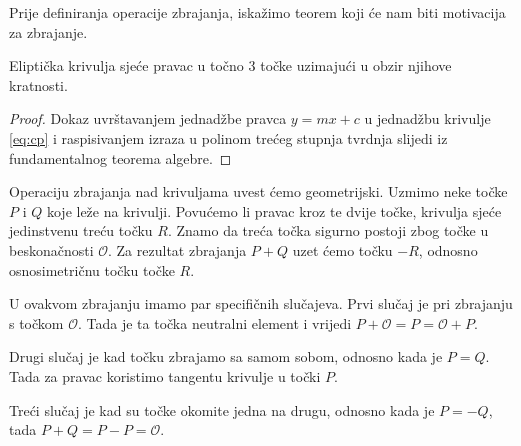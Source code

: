 \documentclass{mathos}
\begin{document}
Prije definiranja operacije zbrajanja, iskažimo teorem koji će nam biti motivacija za zbrajanje.

\begin{theorem}
    Eliptička krivulja sjeće pravac u točno 3 točke uzimajući u obzir njihove kratnosti.
\end{theorem}
\begin{proof}
    Dokaz uvrštavanjem jednadžbe pravca $y = mx + c$ u jednadžbu krivulje \ref{eq:cp} i raspisivanjem izraza u polinom trećeg stupnja tvrdnja slijedi iz fundamentalnog teorema algebre.
\end{proof}

Operaciju zbrajanja nad krivuljama uvest ćemo geometrijski. Uzmimo neke točke $P$ i $Q$ koje leže na krivulji. Povućemo li pravac kroz te dvije točke, krivulja sjeće jedinstvenu treću točku $R$. Znamo da treća točka sigurno postoji zbog točke u beskonačnosti $\mathcal{O}$. Za rezultat zbrajanja $P + Q$ uzet ćemo točku $-R$, odnosno osnosimetričnu točku točke $R$. 

U ovakvom zbrajanju imamo par specifičnih slučajeva. Prvi slučaj je pri zbrajanju s točkom $\mathcal{O}$. Tada je ta točka neutralni element i vrijedi $P + \mathcal{O} = P = \mathcal{O} + P$. 

Drugi slučaj je kad točku zbrajamo sa samom sobom, odnosno kada je $P = Q$. Tada za pravac koristimo tangentu krivulje u točki $P$. 

Treći slučaj je kad su točke okomite jedna na drugu, odnosno kada je $P = -Q$, tada $P + Q = P - P = \mathcal{O}$.
\end{document}
